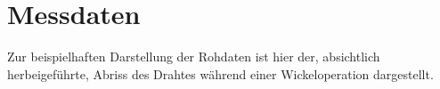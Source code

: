 \section{Messdaten}
\label{sec:Messdaten}

Zur beispielhaften Darstellung der Rohdaten ist hier der, absichtlich herbeigeführte, Abriss des Drahtes während einer Wickeloperation dargestellt.


